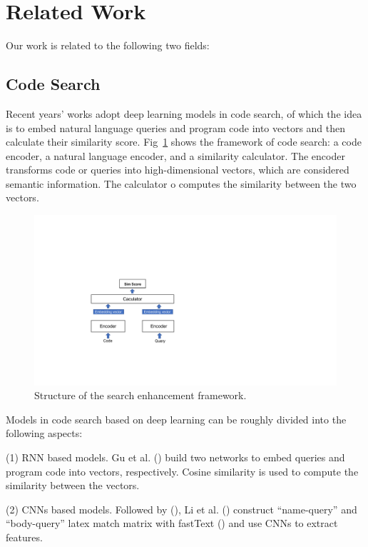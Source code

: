 
\section{Related Work}

Our work is related to the following two fields: 

\subsection{Code Search}

Recent years’ works adopt deep learning models in code search, of which the idea is to embed natural language queries and program code into vectors and then calculate their similarity score. 
Fig~\ref{fig:cs_frame} shows the framework of code search: a code encoder, a natural language encoder, and a similarity calculator. The encoder transforms code or queries into high-dimensional vectors, which are considered semantic information. The calculator o computes the similarity between the two vectors. 

\begin{figure}[htb]
	\centering
	\includegraphics[width=0.8\linewidth]{imgs/code_search_framework.pdf}
	\caption{Structure of the search enhancement framework.}
	\label{fig:cs_frame}
\end{figure}

Models in code search based on deep learning can be roughly 
divided into the following aspects:

(1) RNN based models. Gu et al. (\citealp{DeepCS})
build two networks to embed queries and program code into vectors, respectively. 
Cosine similarity is used to compute the similarity between the vectors. 

(2) CNNs based models. Followed by (\citealp{DeepCS}), Li et al. (\citealp{CQIL}) construct “name-query” 
and “body-query” latex match matrix with fastText (\citealp{fastText}) and use 
CNNs to extract features.  


